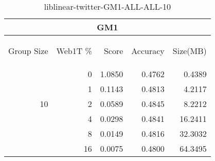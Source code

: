\begin{center}
\begin{table}[htbp] 
 \begin{center}
\begin{tabular}{ | r | r | r | r | r |}
\hline
\multicolumn{5}{|c|}{GM1}\\
\hline
\begin{sideways}Group Size\end{sideways} & \begin{sideways}Web1T \%\end{sideways} & \begin{sideways}Score\end{sideways} & \begin{sideways}Accuracy\end{sideways} & \begin{sideways}Size(MB)\end{sideways}\\
\hline
\multirow{5}{*}{10}
 & 0 & 1.0850 & 0.4762 & 0.4389\\ \cline{2-5}
 & 1 & 0.1143 & 0.4813 & 4.2117\\ \cline{2-5}
 & 2 & 0.0589 & 0.4845 & 8.2212\\ \cline{2-5}
 & 4 & 0.0298 & 0.4841 & 16.2411\\ \cline{2-5}
 & 8 & 0.0149 & 0.4816 & 32.3032\\ \cline{2-5}
 & 16 & 0.0075 & 0.4800 & 64.3495\\ \cline{2-5}
\hline
\end{tabular}
\caption{liblinear-twitter-GM1-ALL-ALL-10}
\label{table:liblinear-twitter-GM1-ALL-ALL-10}
\end{center}
 \end{table}
\end{center}

